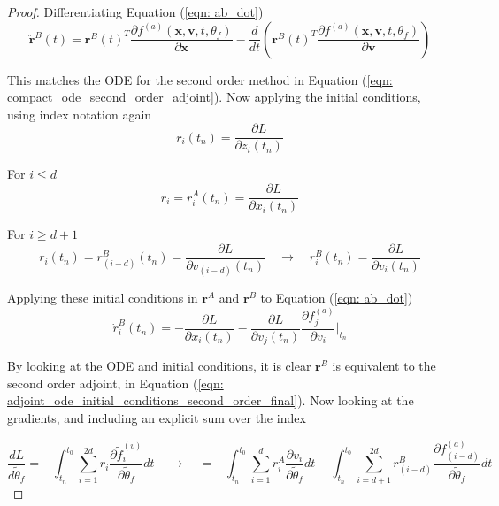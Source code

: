 \documentclass{article}
\theoremstyle{remark}
\theoremstyle{definition}
\begin{document}
\begin{proof}
Differentiating Equation (\ref{eqn: ab_dot})
\begin{equation}
\label{eqn: ab_dot_dot}
    \ddot{\mathbf{r}}^{B}(t) = \mathbf{r}^{B}(t)^{T}\frac{\partial f^{(a)}(\mathbf{x}, \mathbf{v}, t, \theta_{f})}{\partial \mathbf{x}}
-\frac{d}{dt}\left(
    \mathbf{r}^{B}(t)^{T}
    \frac{\partial f^{(a)}(\mathbf{x}, \mathbf{v}, t, \theta_{f})}{\partial \mathbf{v}}
    \right)
\end{equation}

This matches the ODE for the second order method in Equation (\ref{eqn: compact_ode_second_order_adjoint}). Now applying the initial conditions, using index notation again
\begin{equation}
r_{i}(t_{n}) = \frac{\partial L}{\partial z_{i}(t_{n})}
\end{equation}

For $i \leq d$
\begin{equation}
r_{i} = r^{A}_{i}(t_{n}) = \frac{\partial L}{\partial x_{i}(t_{n})}
\end{equation}

For $i \geq d+1$
\begin{equation}
r_{i}(t_{n}) = r^{B}_{(i-d)}(t_{n}) =\frac{\partial L}{\partial v_{(i-d)}(t_{n})}
\quad
\xrightarrow{}
\quad
r^{B}_{i}(t_{n}) = \frac{\partial L}{\partial v_{i}(t_{n})}
\end{equation}

Applying these initial conditions in $\mathbf{r}^{A}$ and $\mathbf{r}^{B}$ to Equation (\ref{eqn: ab_dot})
\begin{equation}
\dot{r}^{B}_{i}(t_{n}) = -\frac{\partial L}{\partial x_{i}(t_{n})} 
-\frac{\partial L}{\partial v_{j}(t_{n})}\frac{\partial f^{(a)}_{j}}{\partial v_{i}}\Biggr\vert_{t_{n}}
\end{equation}

By looking at the ODE and initial conditions, it is clear $\mathbf{r}^{B}$ is equivalent to the second order adjoint, in Equation (\ref{eqn: adjoint_ode_initial_conditions_second_order_final}). Now looking at the gradients, and including an explicit sum over the index

\begin{equation}
\frac{dL}{d\tilde{\theta}_{f}} = -\int_{t_{n}}^{t_{0}}
\sum_{i=1}^{2d}
r_{i}\frac{\partial \tilde{f}^{(v)}_{i}}{\partial \tilde{\theta}_{f}}dt
\quad
\xrightarrow[]{}
\quad
= -\int_{t_{n}}^{t_{0}}\sum_{i=1}^{d}
r^{A}_{i}\frac{\partial v_{i}}{\partial \tilde{\theta}_{f}}dt
-\int_{t_{n}}^{t_{0}}\sum_{i=d+1}^{2d}
r^{B}_{(i-d)}\frac{\partial f^{(a)}_{(i-d)}}{\partial \tilde{\theta}_{f}}dt
\end{equation}


\end{proof}
\end{document}
